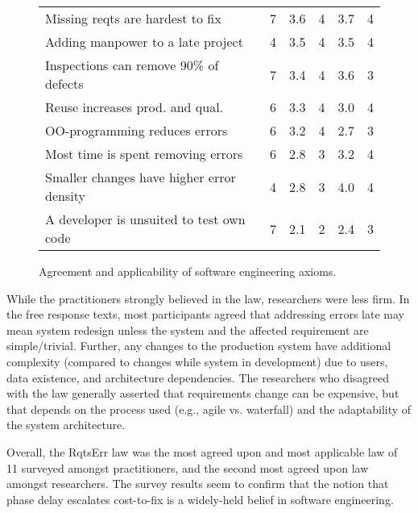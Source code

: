 \begin{figure}[!ht]
\begin{center}
\begin{tabular}{l|c|c|c|c|c}
Missing reqts are hardest to fix & 7 & 3.6 & 4 & 3.7 & 4 \\
Adding manpower to a late project & 4 & 3.5 & 4 & 3.5 & 4 \\
Inspections can remove 90\% of defects & 7 & 3.4 & 4 & 3.6 & 3 \\
Reuse increases prod. and qual. & 6 & 3.3 & 4 & 3.0 & 4 \\
OO-programming reduces errors & 6 & 3.2 & 4 & 2.7 & 3 \\
Most time is spent removing errors & 6 & 2.8 & 3 & 3.2 & 4 \\ 
Smaller changes have higher error density & 4 & 2.8 & 3 & 4.0 & 4 \\
A developer is unsuited to test own code & 7 & 2.1 & 2 & 2.4 & 3
\end{tabular} 

\end{center}
\caption{Agreement and applicability of software engineering axioms.}
\label{fig:survey_results}
\end{figure}

While the practitioners strongly believed in the law, researchers were less firm. In the free response texts, most participants agreed that addressing errors late may mean system redesign unless the system and the affected requirement are simple/trivial. Further, any changes to the production system have additional complexity (compared to changes while system in development) due to users, data existence, and architecture dependencies. The researchers who disagreed with the law generally asserted that requirements change can be expensive, but that depends on the process used (e.g., agile vs. waterfall) and the adaptability of the system architecture.

Overall, the RqtsErr law was the most agreed upon and most applicable law of 11 surveyed amongst practitioners, and the second most agreed upon law amongst researchers. The survey results seem to confirm that the notion that phase delay escalates cost-to-fix is a widely-held belief in software engineering.